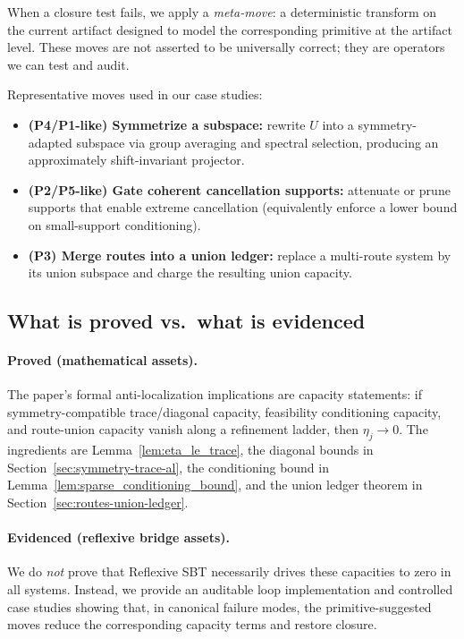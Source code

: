 \documentclass[11pt]{article}
\theoremstyle{plain}
\theoremstyle{definition}
\theoremstyle{remark}
\begin{document}
When a closure test fails, we apply a \emph{meta-move}: a deterministic transform on the current artifact designed to model the corresponding primitive at the artifact level.
These moves are not asserted to be universally correct; they are operators we can test and audit.

Representative moves used in our case studies:
\begin{itemize}
  \item \textbf{(P4/P1-like) Symmetrize a subspace:} rewrite \(U\) into a symmetry-adapted subspace via group averaging and spectral selection, producing an approximately shift-invariant projector.
  \item \textbf{(P2/P5-like) Gate coherent cancellation supports:} attenuate or prune supports that enable extreme cancellation (equivalently enforce a lower bound on small-support conditioning).
  \item \textbf{(P3) Merge routes into a union ledger:} replace a multi-route system by its union subspace and charge the resulting union capacity.
\end{itemize}

\subsection{What is proved vs.\ what is evidenced}\label{subsec:proved-vs-evidenced}

\paragraph{Proved (mathematical assets).}
The paper's formal anti-localization implications are capacity statements:
if symmetry-compatible trace/diagonal capacity, feasibility conditioning capacity, and route-union capacity vanish along a refinement ladder, then \(\eta_j\to 0\).
The ingredients are Lemma~\ref{lem:eta_le_trace}, the diagonal bounds in Section~\ref{sec:symmetry-trace-al}, the conditioning bound in Lemma~\ref{lem:sparse_conditioning_bound}, and the union ledger theorem in Section~\ref{sec:routes-union-ledger}.

\paragraph{Evidenced (reflexive bridge assets).}
We do \emph{not} prove that Reflexive SBT necessarily drives these capacities to zero in all systems.
Instead, we provide an auditable loop implementation and controlled case studies showing that, in canonical failure modes, the primitive-suggested moves reduce the corresponding capacity terms and restore closure.
\end{document}
